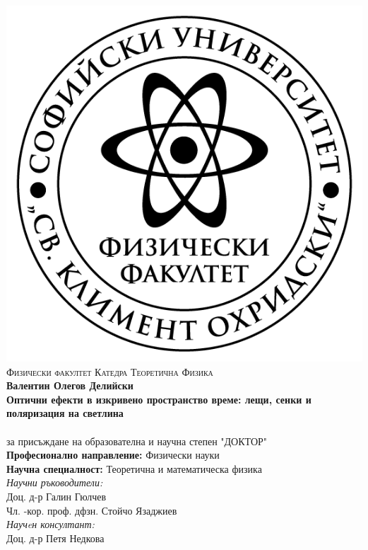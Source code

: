 
\thispagestyle{empty}
\begin{center}

		\centering
		\includegraphics[scale = 1]{logo-FzF.png}
		\noindent\makebox[\linewidth]{\rule{15cm}{0.8pt}}
		\textsc{Физически факултет}
		\noindent\makebox[\linewidth]{\rule{15cm}{0.8pt}}
		\textsc{Катедра Теоретична	 Физика}\\
		\bigskip
		\bigskip
		\bigskip
		\bigskip
		{\Large{\textbf{Валентин Олегов Делийски}}}\\
		\bigskip
		\bigskip
		\bigskip
		{\Large \textbf{Оптични ефекти в изкривено пространство време: лещи, сенки и поляризация на светлина}}\\
		\bigskip
		\bigskip
		\bigskip
		{\textbf{\huge {}}}\\
		\bigskip
		за присъждане на образователна и научна степен "ДОКТОР"\\
		\bigskip
		\bigskip
		\bigskip
		\textbf{Професионално направление:} Физически науки\\
		\textbf{Научна специалност:} Теоретична и математическа физика\\
		\bigskip
		\bigskip
		\bigskip
		\bigskip
		\textit{Научни ръководители:}\\
		Доц. д-р Галин Гюлчев\\
		\bigskip
		Чл. -кор. проф. дфзн. Стойчо Язаджиев\\
		\bigskip
		\textit{Научeн консултант:}\\
		Доц. д-р Петя Недкова\\
		

\end{center}

	